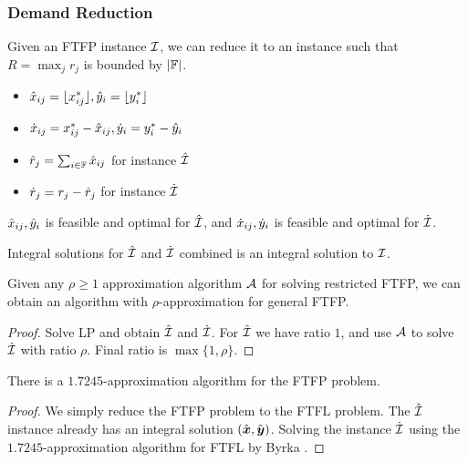 \documentclass[handout, hyperref, xcolor=dvipsnames]{beamer}
\begin{document}
\begin{frame}
  \frametitle{Demand Reduction} Given an FTFP instance $\mathcal{I}$, we can
  reduce it to an instance such that $R=\max_{j}r_j$ is bounded by
  $|\mathbb{F}|$.

  \begin{itemize}
    \item ${\hat x}_{ij} = { \lfloor x_{ij}^\ast \rfloor }, {\hat y}_{i} = { \lfloor y_i^\ast \rfloor }$
    \item ${\dot x}_{ij} = x_{ij}^\ast - {\hat x}_{ij}, {\dot y}_{i} = y_i^\ast
      - {\hat y}_{i}$
    \item ${\hat r}_j = \sum_{i\in\mathbb{F}} {\hat x}_{ij}$ for instance $\hat {\mathcal{I}}$
    \item ${\dot r}_j = r_j - {\hat r}_j$ for instance $\dot {\mathcal{I}}$
  \end{itemize}
  
  \begin{claim}
    ${\hat x}_{ij}, {\hat y}_{i}$ is feasible and optimal for $\hat {\mathcal{I}}$, and
    ${\dot x}_{ij}, {\dot y}_{i}$ is feasible and optimal for $\dot {\mathcal{I}}$.
  \end{claim}
  \begin{claim}
    Integral solutions for $\hat {\mathcal{I}}$ and $\dot {\mathcal{I}}$ combined is an
    integral solution to $\mathcal{I}$.
  \end{claim}
\end{frame}

\begin{frame}
  \begin{theorem}
    Given any $\rho\geq 1$ approximation algorithm ${\cal A}$ for solving
    restricted FTFP, we can obtain an algorithm with
    $\rho$-approximation for general FTFP.
  \end{theorem}
  \begin{proof}
    Solve LP and obtain $\hat {\mathcal{I}}$ and $\dot {\mathcal{I}}$. For $\hat
    {\mathcal{I}}$ we have ratio $1$, and use ${\cal A}$ to solve $\dot {\mathcal{I}}$
    with ratio $\rho$. Final ratio is $\max\{1,\rho\}$.
  \end{proof}
\end{frame}

\begin{frame}
  \begin{corollary}
    There is a $1.7245$-approximation algorithm for the FTFP problem.
  \end{corollary}
  \begin{proof}
    We simply reduce the FTFP problem to the FTFL problem. The $\hat
    {\mathcal{I}}$ instance already has an integral solution
    $(\hat{\boldsymbol{x}},\hat{\boldsymbol{y}})$.  Solving the instance $\dot {\mathcal{I}}$ using the
    $1.7245$-approximation algorithm for FTFL by Byrka {\etal}.
  \end{proof}
\end{frame}
\end{document}
